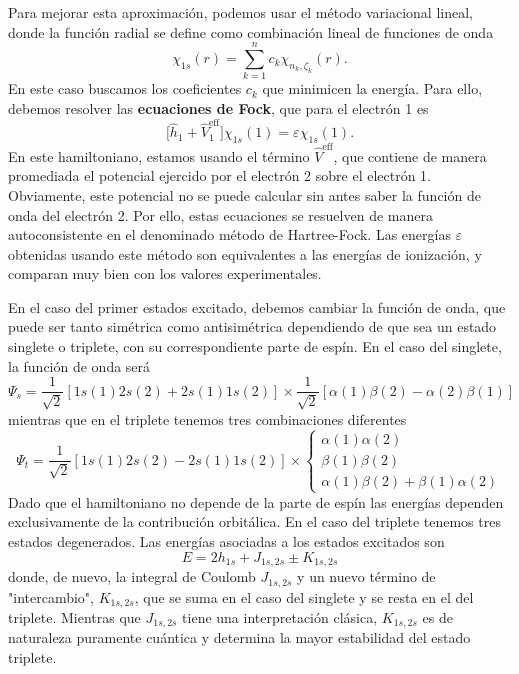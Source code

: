 Para mejorar esta aproximación, podemos usar el método
variacional lineal, donde la función radial 
se define como combinación lineal de funciones de onda
\begin{equation}
    \chi_{1s}(r)=\sum_{k=1}^nc_k\chi_{n_k,\zeta_k}(r).
\end{equation}
En este caso buscamos los coeficientes $c_k$ que minimicen
la energía. Para ello, debemos resolver las \textbf{ecuaciones
de Fock}, que para el electrón 1 es
\begin{equation}
    \bigg[\hat{h}_1+\hat{V}^\mathrm{eff}_1\bigg]\chi_{1s}(1)=\varepsilon\chi_{1s}(1).
\end{equation}
En este hamiltoniano, estamos usando el término $\hat{V}^\mathrm{eff}$,
que contiene de manera promediada el potencial ejercido por el electrón
2 sobre el electrón 1. Obviamente, este potencial no se puede calcular
sin antes saber la función de onda del electrón 2. Por ello, estas
ecuaciones se resuelven de manera autoconsistente en el denominado 
método de Hartree-Fock. Las energías $\varepsilon$ obtenidas usando
este método son equivalentes a las energías de ionización, y comparan
muy bien con los valores experimentales.

En el caso del primer estados excitado, debemos cambiar la función 
de onda, que puede ser tanto simétrica como antisimétrica 
dependiendo de que sea un estado singlete o triplete, con su
correspondiente parte de espín. En el caso del singlete, 
la función de onda será
\begin{equation}
    \Psi_s=\frac{1}{\sqrt{2}}[1s(1)2s(2)+2s(1)1s(2)]\times
    \frac{1}{\sqrt{2}}[\alpha(1)\beta(2)-\alpha(2)\beta(1)]
\end{equation}
mientras que en el triplete tenemos tres combinaciones diferentes
\begin{equation}
\Psi_t=\frac{1}{\sqrt{2}}[1s(1)2s(2)-2s(1)1s(2)]\times
\begin{cases}
\alpha(1)\alpha(2)\\
\beta(1)\beta(2) \\
\alpha(1)\beta(2) + \beta(1)\alpha(2)
\end{cases}
\end{equation}
Dado que el hamiltoniano no depende de la parte de espín
las energías dependen exclusivamente de la contribución
orbitálica. En el caso del triplete tenemos tres estados 
degenerados. Las energías asociadas a los estados excitados
son 
\begin{equation}
    E=2h_{1s} + J_{1s,2s} \pm K_{1s,2s}
\end{equation}
donde, de nuevo, la integral de Coulomb $J_{1s,2s}$
y un nuevo término de "intercambio", $K_{1s,2s}$, que se
suma en el caso del singlete y se resta en el del triplete.
Mientras que $J_{1s,2s}$ tiene una interpretación clásica, 
$K_{1s,2s}$ es de naturaleza puramente cuántica y determina
la mayor estabilidad del estado triplete.

